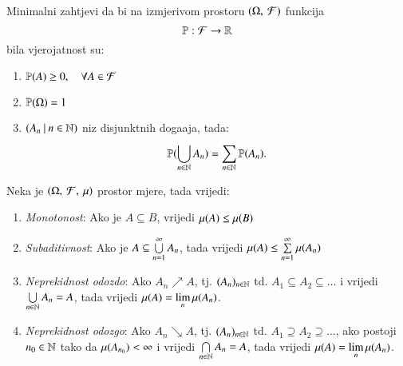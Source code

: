 \begin{nap}
\begin{enumerate}[label=(\alph*)]
        Minimalni zahtjevi da bi na izmjerivom prostoru $(\Omega, \: \mathcal{F})$ funkcija
        \begin{equation*}
            \mathbb{P}: \mathcal{F} \to \mathbb{R}
        \end{equation*}
        bila vjerojatnost su:
        \begin{enumerate}[label=(\roman*)]
            \item $\mathbb{P}({A}) \geq 0, \quad \forall A \in \mathcal{F}$
            \item $\mathbb{P}({\Omega}) = 1$
            \item $({A_n} \: | \: {n \in \mathbb{N}})$ niz disjunktnih doga\dj aja, tada:
            \begin{equation*}
                \mathbb{P}({\bigcup\limits_{n \in \mathbb{N}}^{} A_n}) = \sum\limits_{n \in \mathbb{N}}^{} \mathbb{P}({A_n}).
            \end{equation*}
        \end{enumerate}
    \end{enumerate}
\end{nap}

\begin{tm} \label{tm:1.24-1}
    Neka je $(\Omega, \: \mathcal{F}, \: \mu)$ prostor mjere, tada vrijedi:
    \begin{enumerate}[label={(\roman*)}]
        \item \label{tm:1.24-1.1}
        \emph{Monotonost}: Ako je $A \subseteq B$, vrijedi 
            $\mu({A}) \leq \mu({B})$
        \item \emph{Subaditivnost}: Ako je $A \subseteq \bigcup\limits_{n=1}^{\infty} A_n$, tada
            vrijedi $\mu({A}) \leq \sum\limits_{n=1}^{\infty} \mu({A_n})$
        \item \label{tm:1.24-1.3}
        \emph{Neprekidnost odozdo}: Ako $A_n \nearrow A$, 
            tj. $(A_n)_{n \in \mathbb{N}}$ td. $A_1 \subseteq A_2 \subseteq \dots$ i vrijedi
            $\bigcup\limits_{n \in \mathbb{N}}^{} A_n = A$, tada vrijedi $\mu({A}) =
            \lim\limits_{n} \mu({A_n})$.
        \item \emph{Neprekidnost odozgo}: Ako $A_n \searrow A$, tj. $(A_n)_{n \in \mathbb{N}}$ td.
            $A_1 \supseteq A_2 \supseteq \dots$, ako postoji $n_0 \in \mathbb{N}$ tako da
            $\mu({A_{n_0}}) < \infty$ i vrijedi $\bigcap\limits_{n \in \mathbb{N}}^{} A_n = A$,
            tada vrijedi $\mu({A}) = \lim\limits_{n} \mu({A_n})$.
    \end{enumerate}
\end{tm}

